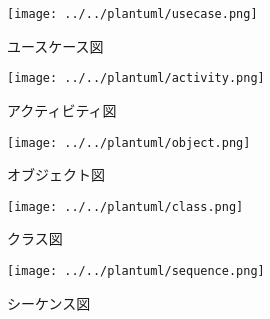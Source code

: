

\begin{figure}[H]
    \centering
    \texttt{[image: ../../plantuml/usecase.png]}
    \caption{ユースケース図}
\end{figure}

\begin{figure}[H]
    \centering
    \texttt{[image: ../../plantuml/activity.png]}
    \caption{アクティビティ図}
\end{figure}

\begin{figure}[H]
    \centering
    \texttt{[image: ../../plantuml/object.png]}
    \caption{オブジェクト図}
\end{figure}

\begin{figure}[H]
    \centering
    \texttt{[image: ../../plantuml/class.png]}
    \caption{クラス図}
\end{figure}

\begin{figure}[H]
    \centering
    \texttt{[image: ../../plantuml/sequence.png]}
    \caption{シーケンス図}
\end{figure}
